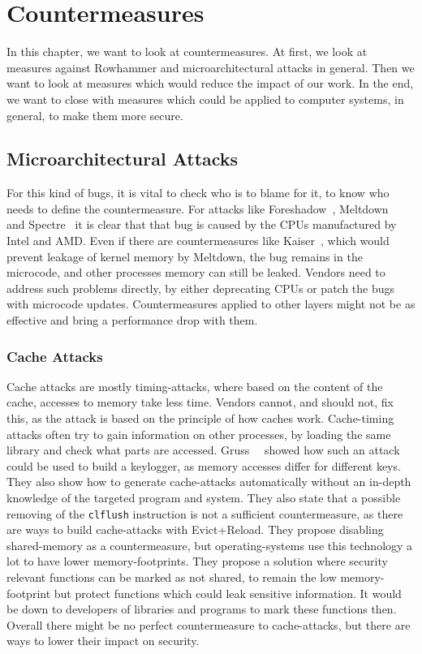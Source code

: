 \chapter{Countermeasures}\label{sec:countermeasure}

In this chapter, we want to look at countermeasures. At first, we look at
measures against Rowhammer and microarchitectural attacks in general. Then we
want to look at measures which would reduce the impact of our work. In the end,
we want to close with measures which could be applied to computer systems, in
general, to make them more secure.

\section{Microarchitectural Attacks}

For this kind of bugs, it is vital to check who is to blame for it, to know who
needs to define the countermeasure. For attacks like
Foreshadow~\cite{foreshadow}, Meltdown~\cite{meltdown} and
Spectre~\cite{spectre} it is clear that that bug is caused by the CPUs
manufactured by Intel and AMD. Even if there are countermeasures like
Kaiser~\cite{kaiserpaper}, which would prevent leakage of kernel memory by
Meltdown, the bug remains in the microcode, and other processes\textquotesingle
memory can still be leaked. Vendors need to address such problems directly, by
either deprecating CPUs or patch the bugs with microcode updates.
Countermeasures applied to other layers might not be as effective and bring a
performance drop with them.

\subsection{Cache Attacks}

Cache attacks are mostly timing-attacks, where based on the content of the
cache, accesses to memory take less time. Vendors cannot, and should not, fix
this, as the attack is based on the principle of how caches work. Cache-timing
attacks often try to gain information on other processes, by loading the same
library and check what parts are accessed. Gruss~\etal~\cite{gruss2015cache}
showed how such an attack could be used to build a keylogger, as memory accesses
differ for different keys. They also show how to generate cache-attacks
automatically without an in-depth knowledge of the targeted program and system.
They also state that a possible removing of the \texttt{clflush} instruction is
not a sufficient countermeasure, as there are ways to build cache-attacks with
Evict+Reload. They propose disabling shared-memory as a countermeasure, but
operating-systems use this technology a lot to have lower memory-footprints.
They propose a solution where security relevant functions can be marked as not
shared, to remain the low memory-footprint but protect functions which could
leak sensitive information. It would be down to developers of libraries and
programs to mark these functions then. Overall there might be no perfect
countermeasure to cache-attacks, but there are ways to lower their impact on
security.

